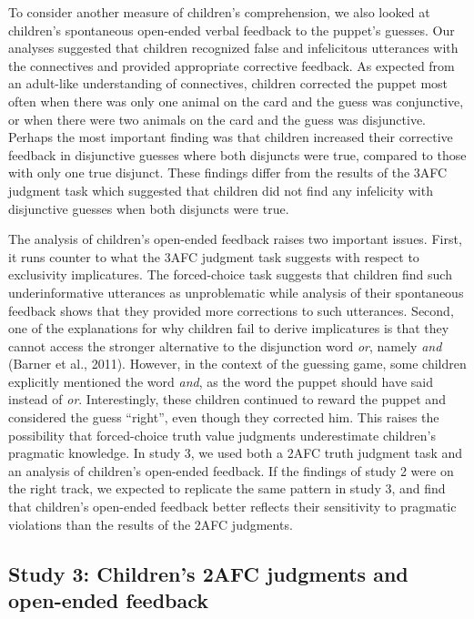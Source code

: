 \documentclass[floatsintext,man]{apa6}
\theoremstyle{definition}
\theoremstyle{definition}
\theoremstyle{definition}
\theoremstyle{remark}
\begin{document}
To consider another measure of children's comprehension, we also looked
at children's spontaneous open-ended verbal feedback to the puppet's
guesses. Our analyses suggested that children recognized false and
infelicitous utterances with the connectives and provided appropriate
corrective feedback. As expected from an adult-like understanding of
connectives, children corrected the puppet most often when there was
only one animal on the card and the guess was conjunctive, or when there
were two animals on the card and the guess was disjunctive. Perhaps the
most important finding was that children increased their corrective
feedback in disjunctive guesses where both disjuncts were true, compared
to those with only one true disjunct. These findings differ from the
results of the 3AFC judgment task which suggested that children did not
find any infelicity with disjunctive guesses when both disjuncts were
true.

The analysis of children's open-ended feedback raises two important
issues. First, it runs counter to what the 3AFC judgment task suggests
with respect to exclusivity implicatures. The forced-choice task
suggests that children find such underinformative utterances as
unproblematic while analysis of their spontaneous feedback shows that
they provided more corrections to such utterances. Second, one of the
explanations for why children fail to derive implicatures is that they
cannot access the stronger alternative to the disjunction word
\emph{or}, namely \emph{and} (Barner et al., 2011). However, in the
context of the guessing game, some children explicitly mentioned the
word \emph{and}, as the word the puppet should have said instead of
\emph{or}. Interestingly, these children continued to reward the puppet
and considered the guess \enquote{right}, even though they corrected
him. This raises the possibility that forced-choice truth value
judgments underestimate children's pragmatic knowledge. In study 3, we
used both a 2AFC truth judgment task and an analysis of children's
open-ended feedback. If the findings of study 2 were on the right track,
we expected to replicate the same pattern in study 3, and find that
children's open-ended feedback better reflects their sensitivity to
pragmatic violations than the results of the 2AFC judgments.

\subsection{Study 3: Children's 2AFC judgments and open-ended
feedback}\label{study3}
\end{document}
